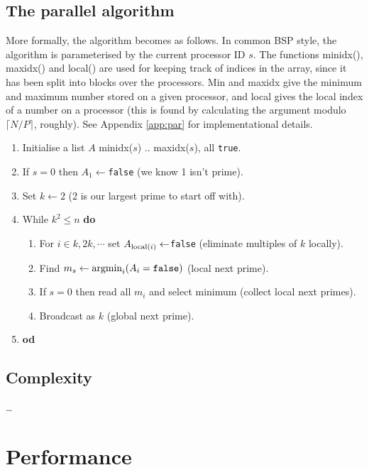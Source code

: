 \documentclass[a4paper]{article}
\begin{document}
\subsection{The parallel algorithm}

More formally, the algorithm becomes as follows. In common BSP style, the
algorithm is parameterised by the current processor ID $s$. The functions
minidx(), maxidx() and local() are used for keeping track of indices in the
array, since it has been split into blocks over the processors. Min and maxidx
give the minimum and maximum number stored on a given processor, and local gives
the local index of a number on a processor (this is found by calculating the
argument modulo $\lceil N/P \rceil$, roughly). See Appendix \ref{app:par} for
implementational details. 

\begin{enumerate}
    \item Initialise a list $A$ minidx($s$) .. maxidx($s$), all \texttt{true}.
    \item If $s=0$ then $A_1 \leftarrow $\texttt{false} (we know 1 isn't prime).
    \item Set $k\leftarrow 2$ (2 is our largest prime to start off with).
    \item While $k^2 \le n$ \textbf{do}
        \begin{enumerate}
            \item For $i \in {k, 2 k, \cdots }$ set $A_{\textnormal{local}(i)} \leftarrow
                $\texttt{false} (eliminate multiples of $k$ locally).
            \item Find $m_s \leftarrow \displaystyle \textnormal{argmin}_{i}
                (A_i = \texttt{false})$ (local next prime).
            \item If $s=0$ then read all $m_i$ and select minimum (collect local
                next primes).
            \item Broadcast as $k$ (global next prime).
        \end{enumerate}
    \item \textbf{od}
\end{enumerate}

\subsection{Complexity}

\ldots

\section{Performance}
\end{document}
